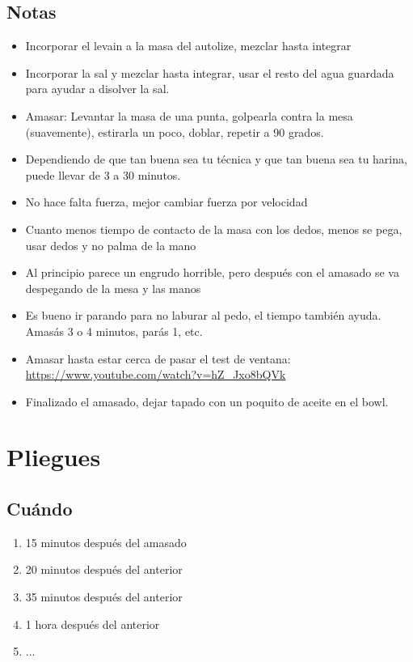 \documentclass[10pt,a4paper]{article}
\begin{document}
\subsection*{Notas}
  \begin{itemize}
    \item Incorporar el levain a la masa del autolize, mezclar hasta integrar
    \item Incorporar la sal y mezclar hasta integrar, usar el resto del agua
      guardada para ayudar a disolver la sal.
    \item Amasar: Levantar la masa de una punta, golpearla contra la mesa (suavemente),
      estirarla un poco, doblar, repetir a 90 grados.
    \item Dependiendo de que tan buena sea tu técnica y que tan buena sea tu
      harina, puede llevar de 3 a 30 minutos.
    \item No hace falta fuerza, mejor cambiar fuerza por velocidad
    \item Cuanto menos tiempo de contacto de la masa  con los dedos,
      menos se pega, usar dedos y no palma de la mano
    \item Al principio parece un engrudo horrible, pero después con
      el amasado se va despegando de la mesa y las manos
    \item Es bueno ir parando para no laburar al pedo, el tiempo también ayuda.
      Amasás 3 o 4 minutos, parás 1, etc.
    \item Amasar hasta estar cerca de pasar el test de ventana:
      \url{https://www.youtube.com/watch?v=hZ_Jxo8bQVk}
    \item Finalizado el amasado, dejar tapado con un poquito de aceite
      en el bowl.

  \end{itemize}

\section{Pliegues}
\subsection*{Cuándo}
  \begin{enumerate}
    \item 15 minutos después del amasado
    \item 20 minutos después del anterior
    \item 35 minutos después del anterior
    \item 1 hora después del anterior
    \item ...
  \end{enumerate}
\end{document}
